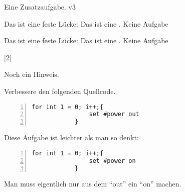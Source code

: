 \documentclass[a4paper,12pt]{scrartcl}
\begin{document}
    \begin{aufgabe*}[points=10,]
        Eine Zusatzaufgabe. v3

        \begin{teilaufgaben}
            \teilaufgabe Das ist eine feste Lücke: \luecke[style={\uwave{#1}}]{2cm}
            \teilaufgabe Das ist eine .
            \teilaufgabe Keine Aufgabe
        \end{teilaufgaben}

        \begin{loesung*}
        \begin{teilaufgaben}
            \teilaufgabe Das ist eine feste Lücke: \luecke[style={\uwave{#1}}]{2cm}
            \teilaufgabe Das ist eine .
            \teilaufgabe Keine Aufgabe
        \end{teilaufgaben}

        \end{loesung*}
        \begin{erwartungen}
            [2]
        \end{erwartungen}
        \begin{bearbeitungshinweis}
            Noch ein Hinweis.
        \end{bearbeitungshinweis}
    \end{aufgabe*}


    \begin{aufgabe}[points=5,subtitle=Aufgabe mit Quellcode und (Sub-)Titel]
        \setzeSymbol{\symHaken}
        Verbessere den folgenden Quellcode.
        \begin{lstlisting}[basicstyle={\ttfamily},numbers=left,gobble=10]
            for int 1 = 0; i++;{
                set #power out
            }
        \end{lstlisting}
    \end{aufgabe}
    \begin{loesung}
        Diese Aufgabe ist leichter als man so denkt:
        \begin{lstlisting}[basicstyle={\ttfamily},numbers=left,gobble=10]
            for int 1 = 0; i++;{
                set #power on
            }
        \end{lstlisting}
        Man muss eigentlich nur aus dem \enquote{out} ein \enquote{on} machen.
    \end{loesung}
\end{document}
